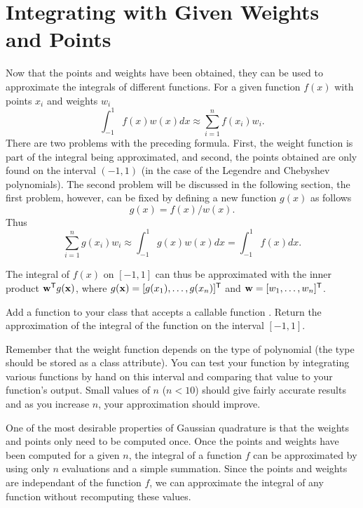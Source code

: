 \section*{Integrating with Given Weights and Points} %

Now that the points and weights have been obtained, they can be used to approximate the integrals of different functions.
For a given function $f(x)$ with points $x_i$ and weights $w_i$
\[
\int_{-1}^{1} f(x) w(x) dx \approx \sum_{i=1}^n f(x_i)w_i.
\]
There are two problems with the preceding formula.
First, the weight function is part of the integral being approximated, and second, the points obtained are only found on the interval $(-1,1)$ (in the case of the Legendre and Chebyshev polynomials).
The second problem will be discussed in the following section, the first problem, however, can be fixed by defining a new function $g(x)$ as follows
\[
g(x) = f(x) / w(x).
\]
Thus
\[
\sum_{i=1}^n g(x_i)w_i \approx \int_{-1}^{1} g(x) w(x) dx = \int_{-1}^{1} f(x) dx.
\]

The integral of $f(x)$ on $[-1,1]$ can thus be approximated with the inner product $\mathbf{w}^{\mathsf T} g(\mathbf{x})$, where $g(\mathbf{x}) = [g(x_1),\dots,g(x_n)]^{\mathsf T}$ and $\mathbf{w} = [w_1,\dots,w_n]^{\mathsf T}$.

\begin{problem} %
Add a function to your class that accepts a callable function .
Return the approximation of the integral of the function  on the interval $[-1,1]$.

Remember that the weight function depends on the type of polynomial (the type should be stored as a class attribute).
You can test your function by integrating various functions by hand on this interval and comparing that value to your function's output.
Small values of $n$ ($n<10$) should give fairly accurate results and as you increase $n$, your approximation should improve.
\label{prob:basic}
\end{problem}

\begin{info}
One of the most desirable properties of Gaussian quadrature is that the weights and points only need to be computed once.
Once the points and weights have been computed for a given $n$, the integral of a function $f$ can be approximated by using only $n$ evaluations and a simple summation.
Since the points and weights are independant of the function $f$, we can approximate the integral of any function without recomputing these values.
\end{info}


